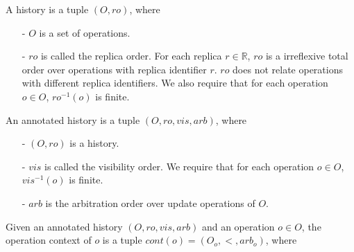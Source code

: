 
A history is a tuple $(O,\mathit{ro})$, where 

\begin{itemize}
\setlength{\itemsep}{0.5pt}
\item[-] $O$ is a set of operations.

\item[-] $\mathit{ro}$ is called the replica order. For each replica $r \in \mathbb{R}$, $\mathit{ro}$ is a irreflexive total order over operations with replica identifier $r$. $\mathit{ro}$ does not relate operations with different replica identifiers. We also require that for each operation $o \in O$, $\mathit{ro}^{-1}(o)$ is finite. 
\end{itemize}

An annotated history is a tuple $(O,\mathit{ro},\mathit{vis},\mathit{arb})$, where 

\begin{itemize}
\setlength{\itemsep}{0.5pt}
\item[-] $(O,\mathit{ro})$ is a history. 

\item[-] $\mathit{vis}$ is called the visibility order. We require that for each operation $o \in O$, $\mathit{vis}^{-1}(o)$ is finite.

\item[-] $\mathit{arb}$ is the arbitration order over update operations of $O$. 
\end{itemize}


Given an annotated history $(O,\mathit{ro},\mathit{vis},\mathit{arb})$ and an operation $o \in O$, the operation context of $o$ is a tuple $cont(o)=(O_o,<,arb_o)$, where 

